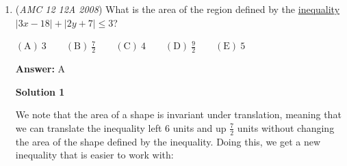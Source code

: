 \begin{enumerate}
 Since $OP=OC-PC=OC-r=R-r$, we have $R-r=2PQ$, or $R-r=2r$, or $\frac{1}{3}=\frac{r}{R}$.

 Ratio of areas of circles is ratio of radii squared, so the answer is $\left(\frac{1}{3}\right)^2 = \frac{1}{9} \Rightarrow \boxed{B}$




\textbf{Solution 2}

Like in Solution 1, let $P$ be the center of the small circle with radius $r$, and let $Q$ be the point where the small circle is \href{https://artofproblemsolving.com/wiki/index.php?title=Tangent}{tangent} to $OA$.

 Let $N$ be the tangency point of the two circles. As shown in Solution 1, $POQ = 30$ degrees, so angle $NOA$ is also $30$ degrees. Let the line tangent to the two circles at $N$ intersect $OA$ and $OB$ at points $C$ and $D$, respectively. Since line $CD$ is tangent to circles $O$ and $P$, it must be perpendicular to $ON$, meaning that angle $ONC$ must be $90$ degrees. Because angle $NOA$ is $30$ degrees, angle $DCO$ is $180-30-90 = 60$ degrees. Angle $DOC$ is also $60$ degrees, so triangle $DOC$ is equilateral.

 Note that an equilateral triangle's incenter is also its centroid. This means the center of the inscribed circle is also the centroid. From properties of median lengths, the radius of the large circle is 3 times the radius of the small circle. 

 Then the ratio of areas will be $\frac{1}{3}$ squared, or $\frac{1}{9}\Rightarrow \boxed{\text{B}}$.

 


	\item (\textit{AMC 12 12A 2008}) What is the area of the region defined by the \href{https://artofproblemsolving.com/wiki/index.php?title=Inequality}{inequality} $|3x-18|+|2y+7|\le3$?


 $\mathrm{(A)}\ 3\qquad\mathrm{(B)}\ \frac {7}{2}\qquad\mathrm{(C)}\ 4\qquad\mathrm{(D)}\ \frac{9}{2}\qquad\mathrm{(E)}\ 5$

 \textbf{Answer: }A



\textbf{Solution 1}

We note that the area of a shape is invariant under translation, meaning that we can translate the inequality left $6$ units and up $\frac{7}{2}$ units without changing the area of the shape defined by the inequality. Doing this, we get a new inequality that is easier to work with:


\end{enumerate}
